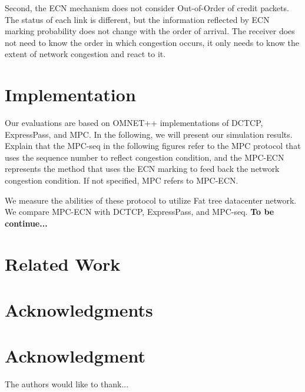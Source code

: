 \documentclass[conference,compsoc]{IEEEtran}
\begin{document}
Second, the ECN mechanism does not consider Out-of-Order of credit packets. The status of each link is different, but the information reflected by ECN marking probability does not change with the order of arrival. The receiver does not need to know the order in which congestion occurs, it only needs to know the extent of network congestion and react to it.

\section{Implementation}
Our evaluations are based on OMNET++ implementations of DCTCP, ExpressPass, and MPC. In the following, we will present our simulation results. Explain that the MPC-seq in the following figures refer to the MPC protocol that uses the sequence number to reflect congestion condition, and the MPC-ECN represents the method that uses the ECN marking to feed back the network congestion condition. If not specified, MPC refers to MPC-ECN.

We measure the abilities of these protocol to utilize Fat tree datacenter network. We compare MPC-ECN with DCTCP, ExpressPass, and MPC-seq.
\textbf{To be continue...}

\section{Related Work}
\ifCLASSOPTIONcompsoc
  \section*{Acknowledgments}
\else
  \section*{Acknowledgment}
\fi




The authors would like to thank...





\end{document}
